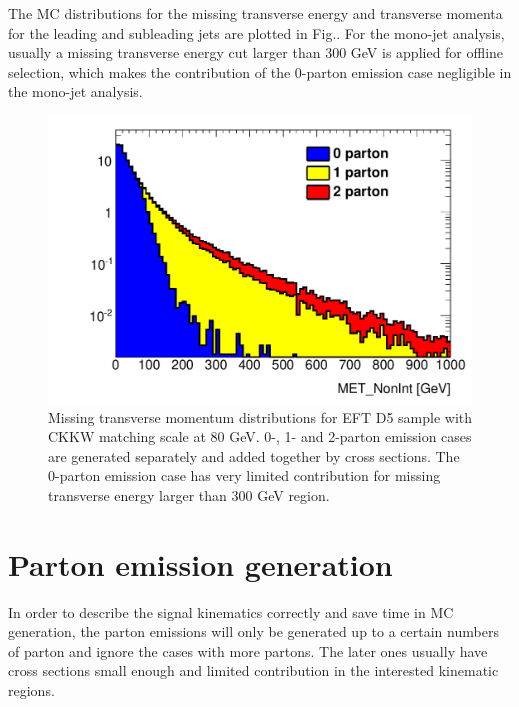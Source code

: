 The MC distributions for the missing transverse energy and transverse momenta for the leading and subleading jets are plotted in Fig.. For the mono-jet analysis, usually a missing transverse energy cut larger than 300 GeV is applied for offline selection, which makes the contribution of the 0-parton emission case negligible in the mono-jet analysis.

\begin{figure}[h!]
	\centering  
    \includegraphics[width=0.8\linewidth]{figures/monojet_appendix/MET_matching80.pdf}
	\caption{Missing transverse momentum distributions for EFT D5 sample with CKKW matching scale at 80 GeV. 0-, 1- and 2-parton emission cases are generated separately and added together by cross sections. The 0-parton emission case has very limited contribution for missing transverse energy larger than 300 GeV region.}
	\label{fig:Kine_D5_80}
\end{figure}


\section{Parton emission generation}
\label{sec:monojet_parton_emission}
In order to describe the signal kinematics correctly and save time in MC generation, the parton emissions will only be generated up to a certain numbers of parton and ignore the cases with more partons. The later ones usually have cross sections small enough and limited contribution in the interested kinematic regions.

